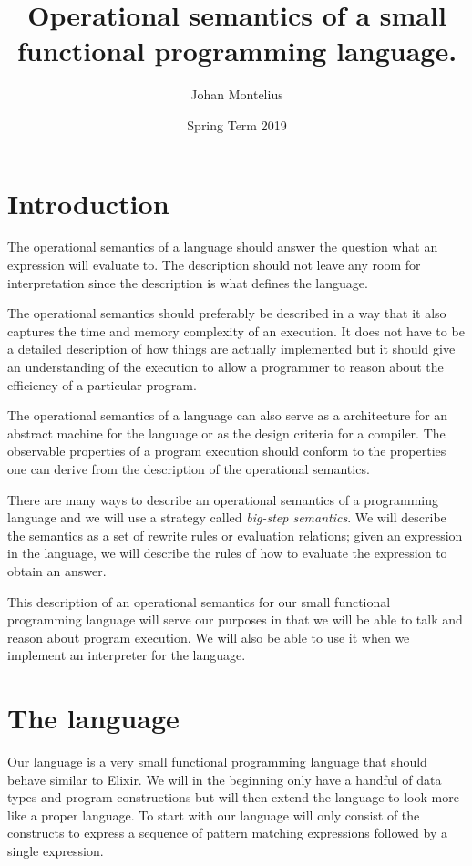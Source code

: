 \documentclass[a4paper,11pt]{article}
\begin{document}
\title{
    \textbf{ Operational semantics of a small functional programming language.}\\
}
\author{Johan Montelius}
\date{Spring Term 2019}
\maketitle
{}

\section*{Introduction}

The operational semantics of a language should answer the question
what an expression will evaluate to. The description should not leave
any room for interpretation since the description is what defines the
language.

The operational semantics should preferably be described in a way that
it also captures the time and memory complexity of an execution. It
does not have to be a detailed description of how things are actually
implemented but it should give an understanding of the execution to
allow a programmer to reason about the efficiency of a particular
program.

The operational semantics of a language can also serve as a
architecture for an abstract machine for the language or as the design
criteria for a compiler. The observable properties of a program
execution should conform to the properties one can derive from the
description of the operational semantics.

There are many ways to describe an operational semantics of a
programming language and we will use a strategy called {\em big-step
  semantics}. We will describe the semantics as a set of rewrite rules
or evaluation relations; given an expression in the language, we will
describe the rules of how to evaluate the expression to obtain an
answer.

This description of an operational semantics for our small functional
programming language will serve our purposes in that we will be able
to talk and reason about program execution. We will also be able to
use it when we implement an interpreter for the language.


\section{The language}

Our language is a very small functional programming language that
should behave similar to Elixir. We will in the beginning only have a
handful of data types and program constructions but will then extend
the language to look more like a proper language. To start with our
language will only consist of the constructs to express a sequence of
pattern matching expressions followed by a single expression.
\end{document}
